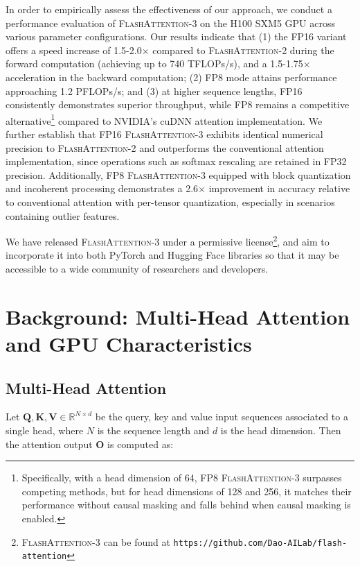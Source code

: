 In order to empirically assess the effectiveness of our approach, we conduct a performance evaluation of \textsc{FlashAttention-3} on the H100 SXM5 GPU across various parameter configurations. Our results indicate that (1) the FP16 variant offers a speed increase of 1.5-2.0$\times$ compared to \textsc{FlashAttention-2} during the forward computation (achieving up to 740 TFLOPs/s), and a 1.5-1.75$\times$ acceleration in the backward computation; (2) FP8 mode attains performance approaching 1.2 PFLOPs/s; and (3) at higher sequence lengths, FP16 consistently demonstrates superior throughput, while FP8 remains a competitive alternative\footnote{Specifically, with a head dimension of 64, FP8 \textsc{FlashAttention-3} surpasses competing methods, but for head dimensions of 128 and 256, it matches their performance without causal masking and falls behind when causal masking is enabled.} compared to NVIDIA's cuDNN attention implementation. We further establish that FP16 \textsc{FlashAttention-3} exhibits identical numerical precision to \textsc{FlashAttention-2} and outperforms the conventional attention implementation, since operations such as softmax rescaling are retained in FP32 precision. Additionally, FP8 \textsc{FlashAttention-3} equipped with block quantization and incoherent processing demonstrates a 2.6$\times$ improvement in accuracy relative to conventional attention with per-tensor quantization, especially in scenarios containing outlier features.

We have released \textsc{FlashAttention-3} under a permissive license\footnote{\textsc{FlashAttention-3}
  can be found at \texttt{https://github.com/Dao-AILab/flash-attention}}, and aim to incorporate it into both PyTorch and Hugging Face libraries so that it may be accessible to a wide community of researchers and developers.

\section{Background: Multi-Head Attention and GPU Characteristics}
\label{sec:background}

\subsection{Multi-Head Attention}
\label{subsec:multi_head_attn}

Let $\mathbf{Q}, \mathbf{K}, \mathbf{V} \in \mathbb{R}^{N \times d}$ be the query, key and value input sequences associated to a single head, where $N$ is the sequence length and $d$ is the head dimension. Then the attention output $\mathbf{O}$ is computed as:


